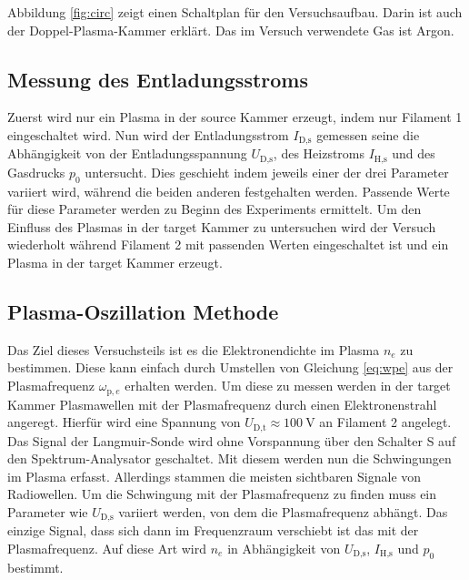 Abbildung \vref{fig:circ} zeigt einen Schaltplan f\"ur den Versuchsaufbau.
Darin ist auch der Doppel-Plasma-Kammer erkl\"art.
Das im Versuch verwendete Gas ist Argon.

\subsection{Messung des Entladungsstroms}
Zuerst wird nur ein Plasma in der source Kammer erzeugt, indem nur Filament 1 eingeschaltet wird.
Nun wird der Entladungsstrom $I_\text{D,s}$ gemessen seine die Abh\"angigkeit von der Entladungsspannung $U_\text{D,s}$, des Heizstroms $I_\text{H,s}$ und des Gasdrucks $p_0$ untersucht.
Dies geschieht indem jeweils einer der drei Parameter variiert wird, w\"ahrend die beiden anderen festgehalten werden.
Passende Werte f\"ur diese Parameter werden zu Beginn des Experiments ermittelt.
Um den Einfluss des Plasmas in der target Kammer zu untersuchen wird der Versuch wiederholt w\"ahrend Filament 2 mit passenden Werten eingeschaltet ist und ein Plasma in der target Kammer erzeugt.

\subsection{Plasma-Oszillation Methode}
Das Ziel dieses Versuchsteils ist es die Elektronendichte im Plasma $n_e$ zu bestimmen.
Diese kann einfach durch Umstellen von Gleichung \eqref{eq:wpe} aus der Plasmafrequenz $\omega_{\text{p},e}$ erhalten werden.
Um diese zu messen werden in der target Kammer Plasmawellen mit der Plasmafrequenz durch einen Elektronenstrahl angeregt.
Hierf\"ur wird eine Spannung von $U_\text{D,t}\approx\SI{100}{\volt}$ an Filament 2 angelegt.
Das Signal der Langmuir-Sonde wird ohne Vorspannung \"uber den Schalter S auf den Spektrum-Analysator geschaltet.
Mit diesem werden nun die Schwingungen im Plasma erfasst.
Allerdings stammen die meisten sichtbaren Signale von Radiowellen.
Um die Schwingung mit der Plasmafrequenz zu finden muss ein Parameter wie $U_\text{D,s}$ variiert werden, von dem die Plasmafrequenz abh\"angt.
Das einzige Signal, dass sich dann im Frequenzraum verschiebt ist das mit der Plasmafrequenz.
Auf diese Art wird $n_e$ in Abh\"angigkeit von $U_\text{D,s}$, $I_\text{H,s}$ und $p_0$ bestimmt.

